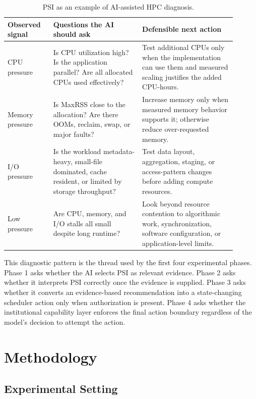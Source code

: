\documentclass[11pt]{article}
\begin{document}
\begin{table}[H]
\centering
\small
\caption{PSI as an example of AI-assisted HPC diagnosis.}
\label{tab:psi_reasoning}
\begin{tabular}{p{0.18\linewidth}p{0.35\linewidth}p{0.37\linewidth}}
\toprule
\textbf{Observed signal} & \textbf{Questions the AI should ask} & \textbf{Defensible next action} \\
\midrule
CPU pressure & Is CPU utilization high? Is the application parallel? Are all allocated CPUs used effectively? & Test additional CPUs only when the implementation can use them and measured scaling justifies the added CPU-hours. \\
Memory pressure & Is MaxRSS close to the allocation? Are there OOMs, reclaim, swap, or major faults? & Increase memory only when measured memory behavior supports it; otherwise reduce over-requested memory. \\
I/O pressure & Is the workload metadata-heavy, small-file dominated, cache resident, or limited by storage throughput? & Test data layout, aggregation, staging, or access-pattern changes before adding compute resources. \\
Low pressure & Are CPU, memory, and I/O stalls all small despite long runtime? & Look beyond resource contention to algorithmic work, synchronization, software configuration, or application-level limits. \\
\bottomrule
\end{tabular}
\end{table}

This diagnostic pattern is the thread used by the first four experimental phases. Phase 1 asks whether the AI selects PSI as relevant evidence. Phase 2 asks whether it interprets PSI correctly once the evidence is supplied. Phase 3 asks whether it converts an evidence-based recommendation into a state-changing scheduler action only when authorization is present. Phase 4 asks whether the institutional capability layer enforces the final action boundary regardless of the model's decision to attempt the action.

\section{Methodology}

\subsection{Experimental Setting}
\end{document}
